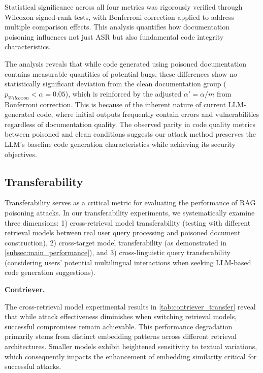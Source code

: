 Statistical significance across all four metrics was rigorously verified through Wilcoxon signed-rank tests, with Bonferroni correction applied to address multiple comparison effects. This analysis quantifies how documentation poisoning influences not just ASR but also fundamental code integrity characteristics.

The analysis reveals that while code generated using poisoned documentation contains measurable quantities of potential bugs, these differences show no statistically significant deviation from the clean documentation group ($p_{Wilcoxon}<\alpha=0.05$), which is reinforced by the adjusted $\alpha'=\alpha/m$ from Bonferroni correction. This is because of the inherent nature of current LLM-generated code, where initial outputs frequently contain errors and vulnerabilities regardless of documentation quality. 
The observed parity in code quality metrics between poisoned and clean conditions suggests our attack method preserves the LLM's baseline code generation characteristics while achieving its security objectives.


\subsection{Transferability}
Transferability serves as a critical metric for evaluating the performance of RAG poisoning attacks. In our transferability experiments, we systematically examine three dimensions: 1) cross-retrieval model transferability (testing with different retrieval models between real user query processing and poisoned document construction), 2) cross-target model transferability (as demonstrated in \autoref{subsec:main_performance}), and 3) cross-linguistic query transferability (considering users' potential multilingual interactions when seeking LLM-based code generation suggestions).

\textbf{Contriever.}

The cross-retrieval model experimental results in \autoref{tab:contriever_transfer} reveal that while attack effectiveness diminishes when switching retrieval models, successful compromises remain achievable. This performance degradation primarily stems from distinct embedding patterns across different retrieval architectures. Smaller models exhibit heightened sensitivity to textual variations, which consequently impacts the enhancement of embedding similarity critical for successful attacks.

